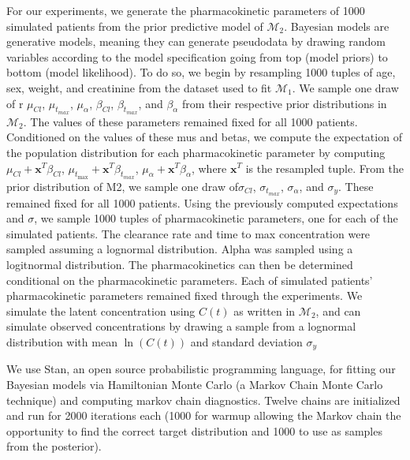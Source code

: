 For our experiments, we generate the pharmacokinetic parameters of 1000 simulated patients from the prior predictive model of $ \mathcal{M}_2 $. Bayesian models are generative models, meaning they can generate pseudodata by drawing random variables according to the model specification going from top (model priors) to bottom (model likelihood).  To do so, we begin by resampling 1000 tuples of age, sex, weight, and creatinine from the dataset used to fit $ \mathcal{M_1} $. We sample one draw of r $ \mu_{Cl} $, $ \mu_{t_{max}} $, $ \mu_{\alpha}$, $ \beta_{Cl} $, $ \beta_{t_{max}} $, and $ \beta_{\alpha} $  from their respective prior distributions in  $ \mathcal{M}_2 $. The values of these parameters remained fixed for all 1000 patients. Conditioned on the values of these mus and betas, we compute the expectation of the population distribution for each pharmacokinetic parameter by computing $ \mu_{Cl} + \mathbf{x}^T \beta_{Cl} $, $ \mu_{t_{\max}} + \mathbf{x}^T \beta_{t_{max}} $,  $ \mu_{\alpha} + \mathbf{x}^T \beta_{\alpha} $, where $\mathbf{x}^T$ is the resampled tuple.  From the prior distribution of M2, we sample one draw of$ \sigma_{Cl} $, $ \sigma_{t_{max}} $, $ \sigma_{\alpha} $, and $ \sigma_y $.  These remained fixed for all 1000 patients. Using the previously computed expectations and $\sigma$, we sample 1000 tuples of pharmacokinetic parameters, one for each of the simulated patients.  The clearance rate and time to max concentration were sampled assuming a lognormal distribution.  Alpha was sampled using a logitnormal distribution. The pharmacokinetics can then be determined conditional on the pharmacokinetic parameters. Each of simulated patients' pharmacokinetic parameters remained fixed through the experiments.  We simulate the latent concentration using $ C(t) $ as written in $\mathcal{M}_2$, and can simulate observed concentrations by drawing a sample from a lognormal distribution with mean $\ln(C(t))$ and standard deviation $ \sigma_y$

We use Stan, an open source probabilistic programming language, for fitting our Bayesian models via Hamiltonian Monte Carlo (a Markov Chain Monte Carlo technique) and computing markov chain diagnostics. Twelve chains are initialized and run for 2000 iterations each (1000 for warmup allowing the Markov chain the opportunity to find the correct target distribution and 1000 to use as samples from the posterior).
